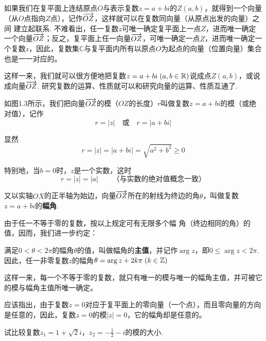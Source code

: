 如果我们在复平面上连结原点$O$与表示复数$z=a+bi$的$Z(a,b)$，就得到一个向量（从$O$点指向$Z$点），记作$\overrightarrow{OZ}$，这样就可以在复数同向量（从原点出发的向量）之间
建立起联系. 不难看出，任一复数$z$可唯一确定复平面上一点$Z$，进而唯一确定一个向量$\overrightarrow{OZ}$；反之，复平面上任一向量$\overrightarrow{OZ}$，可唯一确定一点$Z$，进而唯一确定一个复数$z$，因此，复数集$\mathbb{C}$与复平面内所有以原点$O$为起点的向量（位置向量）集合也是一一对应的。

这样一来，我们就可以很方便地把复数$z=a+bi\; (a,b\in\mathbb{R})$说成点$Z(a,b)$，或说成向量$\overrightarrow{OZ}$. 研究复数的运算、性质就可以和研究向量的运算、性质互通了.

如图1.3所示，我们把向量$\overrightarrow{OZ}$的模（$OZ$的长度）$r$叫做复数$z=a+bi$的模（或绝对值），记作
\[r=|z|\quad \text{或}\quad r=|a+bi|\]
\begin{figure}[htp]
    \centering
{}
    \caption{}
\end{figure}

显然
\[r=|z|=|a+bi|=\sqrt{a^2+b^2}\ge 0\]

特别地，当$b=0$时，$z$是一个实数，这时
\[r=|z|=|a|\qquad  \text{（与实数的绝对值概念一致）
}\]

又以实轴$OX$的正半轴为始边，向量$\overrightarrow{OZ}$所在的射线为终边的角$\theta$，叫做复数$z=a+bi$的\textbf{幅角}.

由于任一不等于零的复数，按以上规定可有无限多个幅
角（终边相同的角）的值，因而，我们进一步约定：

满足$0<\theta<2\pi$的幅角$\theta$的值，叫做幅角的\textbf{主值}，并记作$\arg z$，即$0\le \arg z<2\pi$. 
因此，任一非零复数$z$的幅角$\theta=\arg z+2k\pi\; (k\in\mathbb{Z})$

这样一来，每一个不等于零的复数，就只有唯一的模与唯一的幅角主值，并可被它的模与幅角主值所唯一确定。

应该指出，由于复数$z=0$对应于复平面上的零向量（一个点），而且零向量的方向是任意的，因此，复数$z=0$的模$|z|=0$，它的幅角却是任意的。

\begin{example}
试比较复数$z_1=1+\sqrt{2}i$，$z_2=-\frac{1}{2}-i$的模的大小.
\end{example}


